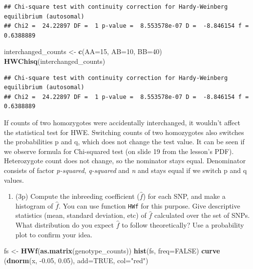 \documentclass[
]{article}
\newenvironment{Shaded}{\begin{snugshade}}{\end{snugshade}}
\newcommand{\DataTypeTok}[1]{\textcolor[rgb]{0.13,0.29,0.53}{#1}}
\newcommand{\DecValTok}[1]{\textcolor[rgb]{0.00,0.00,0.81}{#1}}
\newcommand{\FloatTok}[1]{\textcolor[rgb]{0.00,0.00,0.81}{#1}}
\newcommand{\KeywordTok}[1]{\textcolor[rgb]{0.13,0.29,0.53}{\textbf{#1}}}
\newcommand{\NormalTok}[1]{#1}
\newcommand{\OtherTok}[1]{\textcolor[rgb]{0.56,0.35,0.01}{#1}}
\newcommand{\StringTok}[1]{\textcolor[rgb]{0.31,0.60,0.02}{#1}}
\providecommand{\tightlist}{%
  \setlength{\itemsep}{0pt}\setlength{\parskip}{0pt}}
\begin{document}
\begin{verbatim}
## Chi-square test with continuity correction for Hardy-Weinberg equilibrium (autosomal)
## Chi2 =  24.22897 DF =  1 p-value =  8.553578e-07 D =  -8.846154 f =  0.6388889
\end{verbatim}

\begin{Shaded}
\begin{Highlighting}[]
\NormalTok{interchanged_counts <-}\StringTok{ }\KeywordTok{c}\NormalTok{(}\DataTypeTok{AA=}\DecValTok{15}\NormalTok{, }\DataTypeTok{AB=}\DecValTok{10}\NormalTok{, }\DataTypeTok{BB=}\DecValTok{40}\NormalTok{)}
\KeywordTok{HWChisq}\NormalTok{(interchanged_counts)}
\end{Highlighting}
\end{Shaded}

\begin{verbatim}
## Chi-square test with continuity correction for Hardy-Weinberg equilibrium (autosomal)
## Chi2 =  24.22897 DF =  1 p-value =  8.553578e-07 D =  -8.846154 f =  0.6388889
\end{verbatim}

If counts of two homozygotes were accidentally interchanged, it wouldn't
affect the statistical test for HWE. Switching counts of two homozygotes
also switches the probabilities p and q, which does not change the test
value. It can be seen if we observe formula for Chi-squared test (on
slide 19 from the lesson's PDF). Heterozygote count does not change, so
the nominator stays equal. Denominator consists of factor
\emph{p-squared}, \emph{q-squared} and \emph{n} and stays equal if we
switch p and q values.

\begin{enumerate}
\def\labelenumi{\arabic{enumi}.}
\setcounter{enumi}{15}
\tightlist
\item
  (3p) Compute the inbreeding coefficient (\(\hat{f}\)) for each SNP,
  and make a histogram of \(\hat{f}\). You can use function \texttt{HWf}
  for this purpose. Give descriptive statistics (mean, standard
  deviation, etc) of \(\hat{f}\) calculated over the set of SNPs. What
  distribution do you expect \(\hat{f}\) to follow theoretically? Use a
  probability plot to confirm your idea.
\end{enumerate}

\begin{Shaded}
\begin{Highlighting}[]
\NormalTok{fs <-}\StringTok{ }\KeywordTok{HWf}\NormalTok{(}\KeywordTok{as.matrix}\NormalTok{(genotype_counts))}
\KeywordTok{hist}\NormalTok{(fs, }\DataTypeTok{freq=}\OtherTok{FALSE}\NormalTok{)}
\KeywordTok{curve}\NormalTok{ (}\KeywordTok{dnorm}\NormalTok{(x, }\FloatTok{-0.05}\NormalTok{, }\FloatTok{0.05}\NormalTok{), }\DataTypeTok{add=}\OtherTok{TRUE}\NormalTok{, }\DataTypeTok{col=}\StringTok{"red"}\NormalTok{)}
\end{Highlighting}
\end{Shaded}
\end{document}
